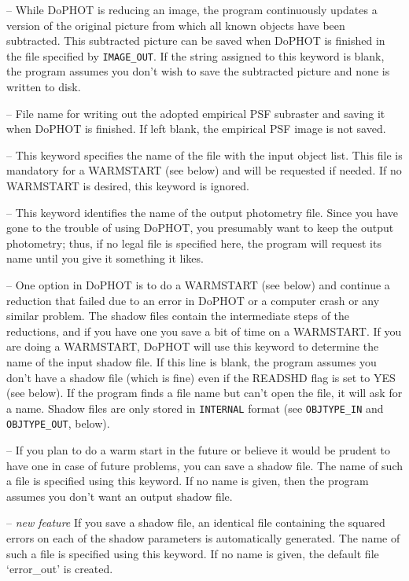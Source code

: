  -- While DoPHOT is reducing an image, the
program continuously 
updates a version of the original picture from which all known objects
have been subtracted.  This subtracted picture can be saved when
DoPHOT is finished in the file specified by {\tt IMAGE\_OUT}.
If the string assigned to this keyword is blank,
the program assumes you don't wish to save the subtracted 
picture and none is written to disk.

 -- File name for writing out the adopted 
empirical PSF subraster and saving it when DoPHOT is finished.
If left blank, the empirical PSF image is not saved.

 -- This keyword specifies the name of
the file with the input object list.  This file is mandatory 
for a WARMSTART (see below) and will be requested if needed. 
If no WARMSTART is desired, this keyword is ignored.

 -- This keyword identifies the name
of the output photometry file.  Since you have gone to the
trouble of using DoPHOT, you
presumably want to keep the output photometry; thus, if no legal file is 
specified here, the program will request its name until you
give it something it likes. 

 -- One option in DoPHOT is to 
do a WARMSTART (see below) and continue a reduction that 
failed due to an error in DoPHOT or a computer crash or
any similar problem.  The shadow files contain the intermediate
steps of the reductions, and if you have one you save a bit
of time on a WARMSTART.  If you are doing a WARMSTART, DoPHOT
will use this keyword to determine the name of the input
shadow file.  If this line is blank, the program assumes you 
don't have a shadow file (which is fine) even if the READSHD
flag is set to YES (see below).   If the program
finds a file name but can't open the file, it will ask for 
a name.  Shadow files are only stored in {\tt INTERNAL} format
(see {\tt OBJTYPE\_IN} and {\tt OBJTYPE\_OUT}, below).

 --  If you plan to do a warm
start in the future or believe it would be prudent to have one
in case of future problems, you can save a shadow file.  The name
of such a file 
is specified using this keyword.  If no name is given, then
the program assumes you don't want an output shadow file.

 -- {\it new feature} If you save a 
shadow file, an identical file containing the squared errors on each of the 
shadow parameters is automatically generated.  The name of such 
a file is specified using this keyword.  If no name is given, the default 
file `error\_out' is created.

